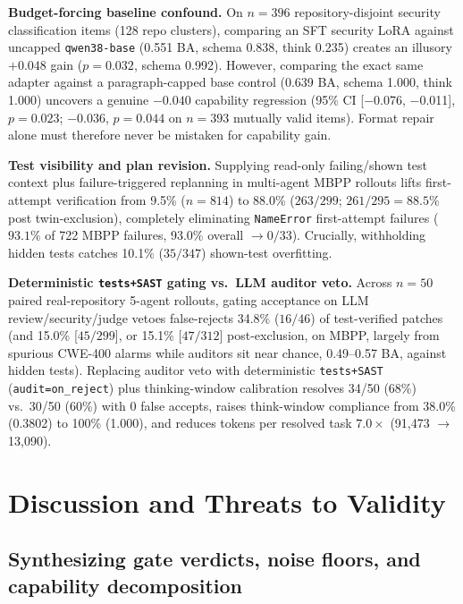 \documentclass[conference]{IEEEtran}
\begin{document}
\textbf{Budget-forcing baseline confound.} On $n=396$ repository-disjoint security classification items (128 repo clusters), comparing an SFT security LoRA against uncapped \texttt{qwen38-{}base} (0.551 BA, schema 0.838, think 0.235) creates an illusory $+0.048$ gain ($p=0.032$, schema 0.992). However, comparing the exact same adapter against a paragraph-capped base control (0.639 BA, schema 1.000, think 1.000) uncovers a genuine $-0.040$ capability regression (95\% CI [$-$0.076, $-$0.011], $p=0.023$; $-0.036$, $p=0.044$ on $n=393$ mutually valid items). Format repair alone must therefore never be mistaken for capability gain.

\textbf{Test visibility and plan revision.} Supplying read-only failing/shown test context plus failure-triggered replanning in multi-agent MBPP rollouts lifts first-attempt verification from 9.5\% ($n=814$) to 88.0\% ($263/299$; $261/295=88.5\%$ post twin-exclusion), completely eliminating \texttt{NameError} first-attempt failures ($93.1\%$ of 722 MBPP failures, 93.0\% overall $\to 0/33$). Crucially, withholding hidden tests catches 10.1\% ($35/347$) shown-test overfitting.

\textbf{Deterministic \texttt{tests+SAST} gating vs.\ LLM auditor veto.} Across $n=50$ paired real-repository 5-agent rollouts, gating acceptance on LLM review/security/judge vetoes false-rejects 34.8\% ($16/46$) of test-verified patches (and 15.0\% [$45/299$], or 15.1\% [$47/312$] post-exclusion, on MBPP, largely from spurious CWE-400 alarms while auditors sit near chance, 0.49--0.57 BA, against hidden tests). Replacing auditor veto with deterministic \texttt{tests+SAST} (\texttt{audit=on\_reject}) plus thinking-window calibration resolves 34/50 (68\%) vs.\ 30/50 (60\%) with 0 false accepts, raises think-window compliance from 38.0\% (0.3802) to 100\% (1.000), and reduces tokens per resolved task $7.0\times$ (91,473 $\to$ 13,090).

\section{Discussion and Threats to Validity}
\label{sec:discussion}

\subsection{Synthesizing gate verdicts, noise floors, and capability decomposition}
\label{sec:discussion-verdicts}
\end{document}
